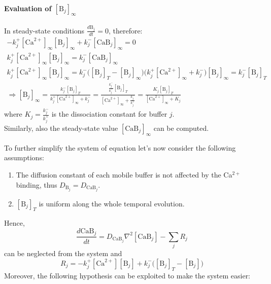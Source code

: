 \paragraph{Evaluation of \([\text{B}_{j}]_{\infty}\)} In steady-state conditions
\(\frac{d\text{B}_{j}}{dt}=0\), therefore:
\begin{gather*}
    -k^{+}_{j}[\text{Ca}^{2+}]_{\infty}[\text{B}_{j}]_{\infty}+k^{-}_{j}[\text{CaB}_{j}]_{\infty}=0\\
    k^{+}_{j}[\text{Ca}^{2+}]_{\infty}[\text{B}_{j}]_{\infty}=k^{-}_{j}[\text{CaB}_{j}]_{\infty}\\
    k^{+}_{j}[\text{Ca}^{2+}]_{\infty}[\text{B}_{j}]_{\infty}=k^{-}_{j}\bigl([\text{B}_{j}]_{T}-[\text{B}_{j}]_{\infty}\bigr)
    \bigl(k^{+}_{j}[\text{Ca}^{2+}]_{\infty}+k^{-}_{j}\bigr)[\text{B}_{j}]_{\infty}=k^{-}_{j}[\text{B}_{j}]_{T}\\
    \Rightarrow
    [\text{B}_{j}]_{\infty}
    =\frac{k^{-}_{j}[\text{B}_{j}]_{T}}{k^{+}_{j}[\text{Ca}^{2+}]_{\infty}+k^{-}_{j}}
    =\frac{\frac{k^{-}_{j}}{k^{+}_{j}}[\text{B}_{j}]_{T}}{[\text{Ca}^{2+}]_{\infty}+\frac{k^{-}_{j}}{k^{+}_{j}}}
    =\frac{K_{j}[\text{B}_{j}]_{T}}{[\text{Ca}^{2+}]_{\infty}+K_{j}}
\end{gather*}
where \(K_{j}=\frac{k^{-}_{j}}{k^{+}_{j}}\) is the dissociation constant for buffer \(j\).\\
Similarly, also the steady-state value \([\text{CaB}_{j}]_{\infty}\) can be computed.\\
\par
To further simplify the system of equation let's now consider the following assumptions:
\begin{enumerate}
    \item The diffusion constant of each mobile buffer is not affected by the Ca\(^{2+}\) binding,
          thus \(D_{\text{B}_{j}}=D_{\text{CaB}_{j}}\).
    \item \([\text{B}_{j}]_{T}\) is uniform along the whole temporal evolution.
\end{enumerate}
Hence,
\begin{equation*}
    \frac{d\text{CaB}_{j}}{dt}=D_{\text{CaB}_{j}}\nabla^{2}[\text{CaB}_{j}]-\sum_{j}R_{j}
\end{equation*}
can be neglected from the system and
\begin{equation*}
    R_{j}=-k^{+}_{j}[\text{Ca}^{2+}][\text{B}_{j}]+k^{-}_{j}\bigl([\text{B}_{j}]_{T}-[\text{B}_{j}]\bigr)
\end{equation*}
Moreover, the following hypothesis can be exploited to make the system easier:
